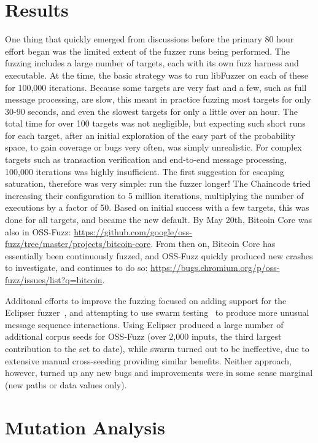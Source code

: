 \section{Results}

One thing that quickly emerged from discussions before the primary 80 hour effort began was the limited extent of the fuzzer runs being performed.  The fuzzing includes a large number of targets, each with its own fuzz harness and executable.  At the time, the basic strategy was to run libFuzzer on each of these for 100,000 iterations.  Because some targets are very fast and a few, such as full message processing, are slow, this meant in practice fuzzing most targets for only 30-90 seconds, and even the slowest targets for only a little over an hour.  The total time for over 100 targets was not negligible, but expecting such short runs for each target, after an initial exploration of the easy part of the probability space, to gain coverage or bugs very often, was simply unrealistic.  For complex targets such as transaction verification and end-to-end message processing, 100,000 iterations was highly insufficient.   The first suggestion for escaping saturation, therefore was very simple:  run the fuzzer longer!  The Chaincode tried increasing their configuration to 5 million iterations, multiplying the number of executions by a factor of 50.  Based on initial success with a few targets, this was done for all targets, and became the new default.  By May 20th, Bitcoin Core was also in OSS-Fuzz: \url{https://github.com/google/oss-fuzz/tree/master/projects/bitcoin-core}.  From then on, Bitcoin Core has essentially been continuously fuzzed, and OSS-Fuzz quickly produced new crashes to investigate, and continues to do so:  \url{https://bugs.chromium.org/p/oss-fuzz/issues/list?q=bitcoin}.

Additonal efforts to improve the fuzzing focused on adding support for the Eclipser fuzzer~\cite{Eclipser}, and attempting to use swarm testing~\cite{ISSTA12} to produce more unusual message sequence interactions.  Using Eclipser produced a large number of additional corpus seeds for OSS-Fuzz (over 2,000 inputs, the third largest contribution to the set to date), while swarm turned out to be ineffective, due to extensive manual cross-seeding providing similar benefits.  Neither approach, however, turned up any new bugs and improvements were in some sense marginal (new paths or data values only).

\section{Mutation Analysis}

